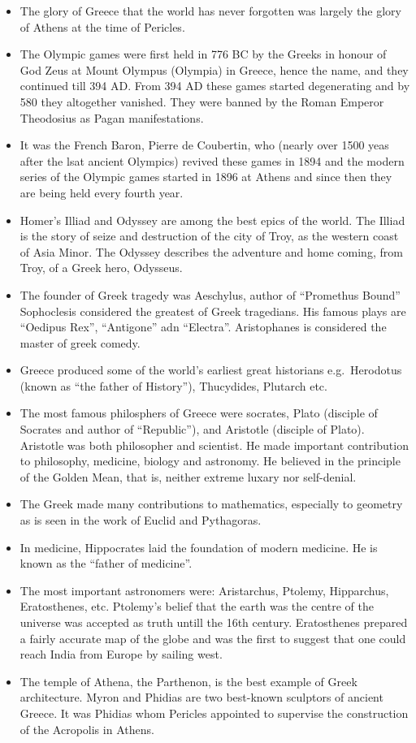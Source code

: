 \documentclass[
  openany]{book}
\providecommand{\tightlist}{%
  \setlength{\itemsep}{0pt}\setlength{\parskip}{0pt}}
\begin{document}
\begin{itemize}
\tightlist
\item
  The glory of Greece that the world has never forgotten was largely the glory of Athens at the time of Pericles.
\item
  The Olympic games were first held in 776 BC by the Greeks in honour of God Zeus at Mount Olympus (Olympia) in Greece, hence the name, and they continued till 394 AD. From 394 AD these games started degenerating and by 580 they altogether vanished. They were banned by the Roman Emperor Theodosius as Pagan manifestations.
\item
  It was the French Baron, Pierre de Coubertin, who (nearly over 1500 yeas after the lsat ancient Olympics) revived these games in 1894 and the modern series of the Olympic games started in 1896 at Athens and since then they are being held every fourth year.
\item
  Homer's Illiad and Odyssey are among the best epics of the world. The Illiad is the story of seize and destruction of the city of Troy, as the western coast of Asia Minor. The Odyssey describes the adventure and home coming, from Troy, of a Greek hero, Odysseus.
\item
  The founder of Greek tragedy was Aeschylus, author of ``Promethus Bound'' Sophoclesis considered the greatest of Greek tragedians. His famous plays are ``Oedipus Rex'', ``Antigone'' adn ``Electra''. Aristophanes is considered the master of greek comedy.
\item
  Greece produced some of the world's earliest great historians e.g.~Herodotus (known as ``the father of History''), Thucydides, Plutarch etc.
\item
  The most famous philosphers of Greece were socrates, Plato (disciple of Socrates and author of ``Republic''), and Aristotle (disciple of Plato). Aristotle was both philosopher and scientist. He made important contribution to philosophy, medicine, biology and astronomy. He believed in the principle of the Golden Mean, that is, neither extreme luxary nor self-denial.
\item
  The Greek made many contributions to mathematics, especially to geometry as is seen in the work of Euclid and Pythagoras.
\item
  In medicine, Hippocrates laid the foundation of modern medicine. He is known as the ``father of medicine''.
\item
  The most important astronomers were: Aristarchus, Ptolemy, Hipparchus, Eratosthenes, etc. Ptolemy's belief that the earth was the centre of the universe was accepted as truth untill the 16th century. Eratosthenes prepared a fairly accurate map of the globe and was the first to suggest that one could reach India from Europe by sailing west.
\item
  The temple of Athena, the Parthenon, is the best example of Greek architecture. Myron and Phidias are two best-known sculptors of ancient Greece. It was Phidias whom Pericles appointed to supervise the construction of the Acropolis in Athens.
\end{itemize}
\end{document}
